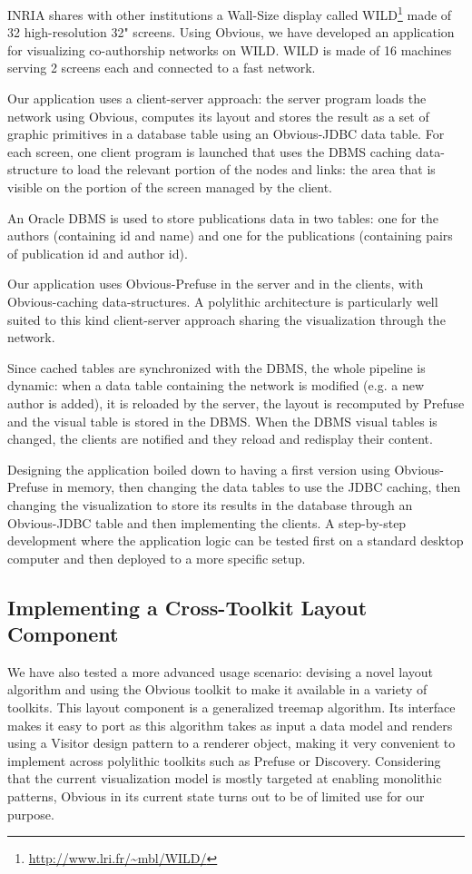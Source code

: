 INRIA shares with other institutions a Wall-Size display called
WILD\footnote{\url{http://www.lri.fr/~mbl/WILD/}} made of 32
high-resolution 32" screens.  Using Obvious, we have developed an
application for visualizing co-authorship networks on WILD.  WILD is
made of 16 machines serving 2 screens each and connected to a fast
network.

Our application uses a client-server approach: the server program
loads the network using Obvious, computes its layout and stores the
result as a set of graphic primitives in a database table using an
Obvious-JDBC data table.  For each screen, one client program is
launched that uses the DBMS caching data-structure to load the
relevant portion of the nodes and links: the area that is visible on
the portion of the screen managed by the client.

An Oracle DBMS is used to store publications data in two tables: one
for the authors (containing id and name) and one for the publications
(containing pairs of publication id and author id).

Our application uses Obvious-Prefuse in the server and in the clients,
with Obvious-caching data-structures.  A polylithic architecture is
particularly well suited to this kind client-server approach sharing
the visualization through the network.

Since cached tables are synchronized with the DBMS, the whole pipeline
is dynamic: when a data table containing the network is modified
(e.g. a new author is added), it is reloaded by the server, the layout
is recomputed by Prefuse and the visual table is stored in the DBMS.
When the DBMS visual tables is changed, the clients are notified and
they reload and redisplay their content.

Designing the application boiled down to having a first version using
Obvious-Prefuse in memory, then changing the data tables to use the
JDBC caching, then changing the visualization to store its results in
the database through an Obvious-JDBC table and then implementing the
clients.  A step-by-step development where the application logic can
be tested first on a standard desktop computer and then deployed to a
more specific setup.

\subsection{Implementing a Cross-Toolkit Layout Component}

We have also tested a more advanced usage scenario: devising
a novel layout algorithm and using the Obvious toolkit to make it
available in a variety of toolkits. This layout component is a
generalized treemap algorithm.
Its interface makes it easy to port as this
algorithm takes as input a data model and renders using a Visitor
design pattern to a renderer object, making it very convenient to
implement across polylithic toolkits such as Prefuse or Discovery.
Considering that the current visualization model is mostly targeted at
enabling monolithic patterns, Obvious in its current state turns out
to be of limited use for our purpose.

